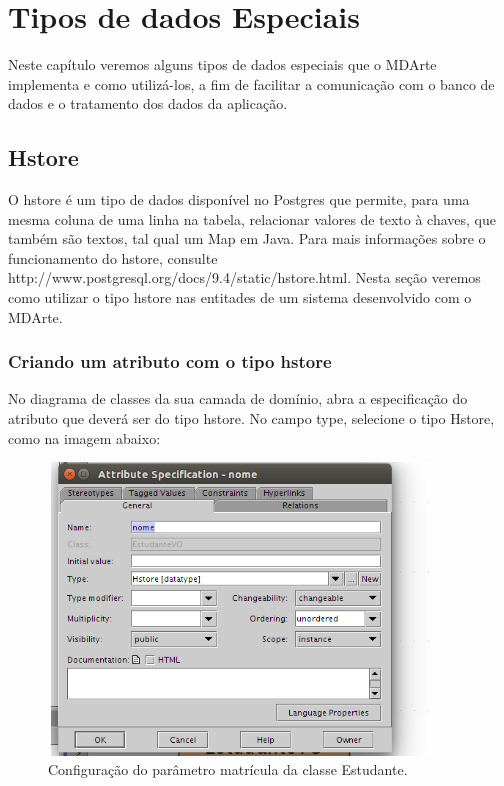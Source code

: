 \chapter{Tipos de dados Especiais}
Neste capítulo veremos alguns tipos de dados especiais que o MDArte implementa e
como utilizá-los, a fim de facilitar a comunicação com o banco de dados e o
tratamento dos dados da aplicação.

\section{Hstore}
O hstore é um tipo de dados disponível no Postgres que permite, para uma mesma
coluna de uma linha na tabela, relacionar valores de texto à chaves, que também
são textos, tal qual um Map em Java.
Para mais informações sobre o funcionamento do hstore, consulte
http://www.postgresql.org/docs/9.4/static/hstore.html.
Nesta seção veremos como utilizar o tipo hstore nas entitades de um sistema
desenvolvido com o MDArte.

\subsection{Criando um atributo com o tipo hstore}
No diagrama de classes da sua camada de domínio, abra a especificação do
atributo que deverá ser do tipo hstore. No campo type, selecione o tipo Hstore,
como na imagem abaixo:
\begin{figure}[H]
	\centering
	\includegraphics[width=290pt,height=220pt]{files/imgs/hstore-0000.png}
	\caption{Configuração do parâmetro matrícula da classe Estudante.}
	\label{config_parametro}
\end{figure}


